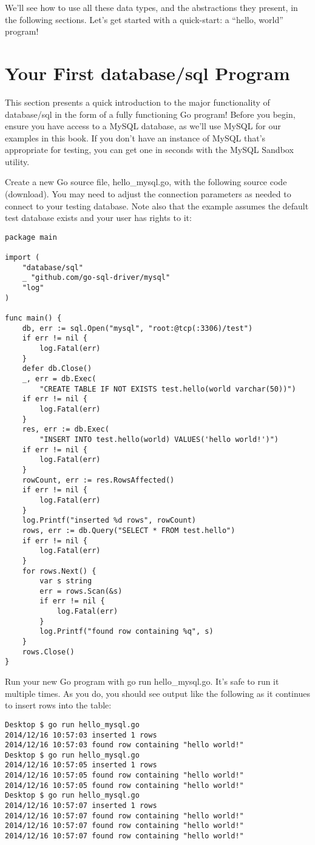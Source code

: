 \documentclass{vivid_layout}
\begin{document}
We’ll see how to use all these data types, and the abstractions they present, in the following sections. Let’s get started with a quick-start: a “hello, world” program!

\section{Your First database/sql Program}

This section presents a quick introduction to the major functionality of database/sql in the form of a fully functioning Go program! Before you begin, ensure you have access to a MySQL database, as we’ll use MySQL for our examples in this book. If you don’t have an instance of MySQL that’s appropriate for testing, you can get one in seconds with the MySQL Sandbox utility.

Create a new Go source file, hello\_mysql.go, with the following source code (download). You may need to adjust the connection parameters as needed to connect to your testing database. Note also that the example assumes the default test database exists and your user has rights to it:

\begin{verbatim}
package main

import (
	"database/sql"
	_ "github.com/go-sql-driver/mysql"
	"log"
)

func main() {
	db, err := sql.Open("mysql", "root:@tcp(:3306)/test")
	if err != nil {
		log.Fatal(err)
	}
	defer db.Close()
	_, err = db.Exec(
		"CREATE TABLE IF NOT EXISTS test.hello(world varchar(50))")
	if err != nil {
		log.Fatal(err)
	}
	res, err := db.Exec(
		"INSERT INTO test.hello(world) VALUES('hello world!')")
	if err != nil {
		log.Fatal(err)
	}
	rowCount, err := res.RowsAffected()
	if err != nil {
		log.Fatal(err)
	}
	log.Printf("inserted %d rows", rowCount)
	rows, err := db.Query("SELECT * FROM test.hello")
	if err != nil {
		log.Fatal(err)
	}
	for rows.Next() {
		var s string
		err = rows.Scan(&s)
		if err != nil {
			log.Fatal(err)
		}
		log.Printf("found row containing %q", s)
	}
	rows.Close()
}
\end{verbatim}

Run your new Go program with go run hello\_mysql.go. It’s safe to run it multiple times. As you do, you should see output like the following as it continues to insert rows into the table:

\begin{verbatim}
Desktop $ go run hello_mysql.go
2014/12/16 10:57:03 inserted 1 rows
2014/12/16 10:57:03 found row containing "hello world!"
Desktop $ go run hello_mysql.go
2014/12/16 10:57:05 inserted 1 rows
2014/12/16 10:57:05 found row containing "hello world!"
2014/12/16 10:57:05 found row containing "hello world!"
Desktop $ go run hello_mysql.go
2014/12/16 10:57:07 inserted 1 rows
2014/12/16 10:57:07 found row containing "hello world!"
2014/12/16 10:57:07 found row containing "hello world!"
2014/12/16 10:57:07 found row containing "hello world!"
\end{verbatim}
\end{document}
